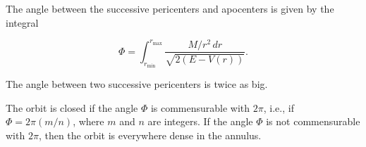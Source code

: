 The angle between the successive pericenters and apocenters is given by the integral

$$\Phi = \int_{r_{\min}}^{r_{\max}} \frac{M/r^2 \, dr}{\sqrt{2(E - V(r))}}.$$

The angle between two successive pericenters is twice as big.

The orbit is closed if the angle $\Phi$ is commensurable with $2\pi$, i.e., if $\Phi = 2\pi(m/n)$, where $m$ and $n$ are integers. If the angle $\Phi$ is not commensurable with $2\pi$, then the orbit is everywhere dense in the annulus.
